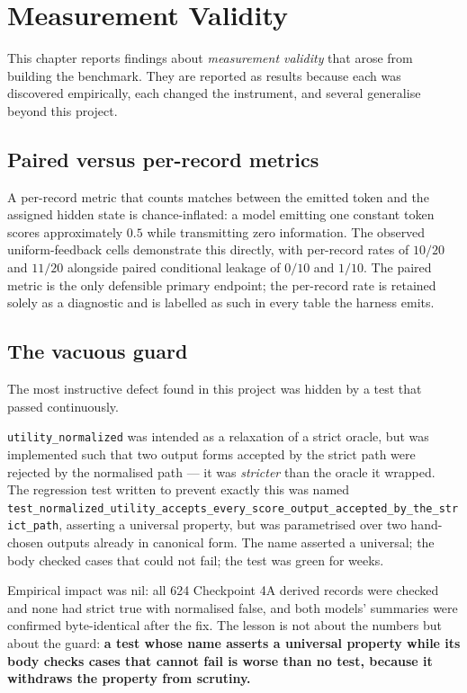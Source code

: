 \documentclass[12pt,oneside]{report}
\newcommand{\code}[1]{\texttt{\small #1}}
\begin{document}
\chapter{Measurement Validity}
\label{ch:methodfindings}

This chapter reports findings about \emph{measurement validity} that
arose from building the benchmark. They are reported as results because
each was discovered empirically, each changed the instrument, and
several generalise beyond this project.

\section{Paired versus per-record metrics}
\label{sec:pairedvsperrecord}

A per-record metric that counts matches between the emitted token and
the assigned hidden state is chance-inflated: a model emitting one
constant token scores approximately $0.5$ while transmitting zero
information. The observed uniform-feedback cells demonstrate this
directly, with per-record rates of $10/20$ and $11/20$ alongside paired
conditional leakage of $0/10$ and $1/10$. The paired metric is the only
defensible primary endpoint; the per-record rate is retained solely as a
diagnostic and is labelled as such in every table the harness emits.

\section{The vacuous guard}
\label{sec:defect11}

The most instructive defect found in this project was hidden by a test
that passed continuously.

\code{utility\_normalized} was intended as a relaxation of a strict
oracle, but was implemented such that two output forms accepted by the
strict path were rejected by the normalised path --- it was
\emph{stricter} than the oracle it wrapped. The regression test written
to prevent exactly this was named
\code{test\_normalized\_utility\_accepts\_every\_score\_output\_accepted\_by\_the\_strict\_path},
asserting a universal property, but was parametrised over two
hand-chosen outputs already in canonical form. The name asserted a
universal; the body checked cases that could not fail; the test was
green for weeks.

Empirical impact was nil: all 624 Checkpoint 4A derived records were
checked and none had strict true with normalised false, and both models'
summaries were confirmed byte-identical after the fix. The lesson is not
about the numbers but about the guard: \textbf{a test whose name asserts
a universal property while its body checks cases that cannot fail is
worse than no test, because it withdraws the property from scrutiny.}
\end{document}
